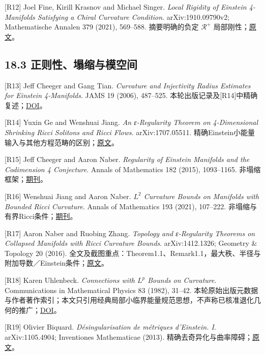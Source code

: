 \documentclass[
  11pt,
  a4paper,
  fontset=none]{ctexart}
\begin{document}
{[}R12{]} Joel Fine, Kirill Krasnov and Michael Singer. \emph{Local
Rigidity of Einstein 4-Manifolds Satisfying a Chiral Curvature
Condition}. arXiv:1910.09790v2; Mathematische Annalen 379 (2021),
569--588. 摘要明确的负定 \(\mathcal R^+\)
局部刚性；\href{https://arxiv.org/abs/1910.09790}{原文}。

\subsection{18.3
正则性、塌缩与模空间}\label{ux6b63ux5219ux6027ux584cux7f29ux4e0eux6a21ux7a7aux95f4}

{[}R13{]} Jeff Cheeger and Gang Tian. \emph{Curvature and Injectivity
Radius Estimates for Einstein 4-Manifolds}. JAMS 19 (2006), 487--525.
本轮出版记录及{[}R14{]}中精确复述；\href{https://doi.org/10.1090/S0894-0347-05-00511-4}{DOI}。

{[}R14{]} Yuxin Ge and Wenshuai Jiang. \emph{An ε-Regularity Theorem on
4-Dimensional Shrinking Ricci Solitons and Ricci Flows}.
arXiv:1707.05511.
精确Einstein小能量输入与其他方程范畴的区别；\href{https://arxiv.org/abs/1707.05511}{原文}。

{[}R15{]} Jeff Cheeger and Aaron Naber. \emph{Regularity of Einstein
Manifolds and the Codimension 4 Conjecture}. Annals of Mathematics 182
(2015), 1093--1165.
非塌缩框架；\href{https://annals.math.princeton.edu/2015/182-3/p05}{期刊}。

{[}R16{]} Wenshuai Jiang and Aaron Naber. \emph{\(L^2\) Curvature Bounds
on Manifolds with Bounded Ricci Curvature}. Annals of Mathematics 193
(2021), 107--222.
非塌缩与有界Ricci条件；\href{https://annals.math.princeton.edu/2021/193-1/p02}{期刊}。

{[}R17{]} Aaron Naber and Ruobing Zhang. \emph{Topology and ε-Regularity
Theorems on Collapsed Manifolds with Ricci Curvature Bounds}.
arXiv:1412.1326; Geometry \& Topology 20 (2016).
全文及截图重点：Theorem1.1、Remark1.1，最大秩、半径与附加导数／Einstein条件；\href{https://arxiv.org/abs/1412.1326}{原文}。

{[}R18{]} Karen Uhlenbeck. \emph{Connections with \(L^p\) Bounds on
Curvature}. Communications in Mathematical Physics 83 (1982), 31--42.
本轮原始出版元数据与作者著作索引；本文只引用经典局部小临界能量规范思想，不声称已核准退化几何的推广；\href{https://doi.org/10.1007/BF01947069}{DOI}。

{[}R19{]} Olivier Biquard. \emph{Désingularisation de métriques
d'Einstein. I}. arXiv:1105.4904; Inventiones Mathematicae (2013).
精确去奇异化与曲率障碍；\href{https://arxiv.org/abs/1105.4904}{原文}。
\end{document}
